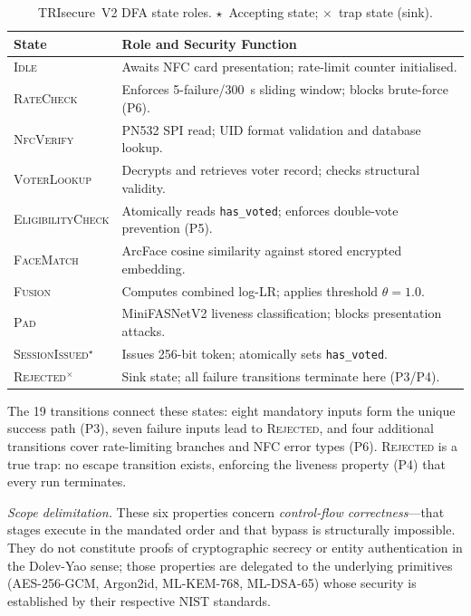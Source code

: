 \documentclass[conference]{IEEEtran}
\begin{document}
\begin{table}[t]
\centering
\caption{TRIsecure~V2 DFA state roles.
  $\star$~Accepting state; $\times$~trap state (sink).}
\label{tab:dfa_states}
\begin{tabular}{lp{5.2cm}}
  \toprule
  State & Role and Security Function \\
  \midrule
  \textsc{Idle}
    & Awaits NFC card presentation; rate-limit counter initialised. \\
  \textsc{RateCheck}
    & Enforces 5-failure/300~s sliding window; blocks brute-force (P6). \\
  \textsc{NfcVerify}
    & PN532 SPI read; UID format validation and database lookup. \\
  \textsc{VoterLookup}
    & Decrypts and retrieves voter record; checks structural validity. \\
  \textsc{EligibilityCheck}
    & Atomically reads \texttt{has\_voted}; enforces double-vote prevention (P5). \\
  \textsc{FaceMatch}
    & ArcFace cosine similarity against stored encrypted embedding. \\
  \textsc{Fusion}
    & Computes combined log-LR; applies threshold \(\theta{=}1.0\). \\
  \textsc{Pad}
    & MiniFASNetV2 liveness classification; blocks presentation attacks. \\
  \textsc{SessionIssued}$^\star$
    & Issues 256-bit token; atomically sets \texttt{has\_voted}. \\
  \textsc{Rejected}$^\times$
    & Sink state; all failure transitions terminate here (P3/P4). \\
  \bottomrule
\end{tabular}
\end{table}

The 19 transitions connect these states: eight mandatory inputs form the
unique success path (P3), seven failure inputs lead to \textsc{Rejected},
and four additional transitions cover rate-limiting branches and NFC
error types (P6). \textsc{Rejected} is a true trap: no escape transition
exists, enforcing the liveness property (P4) that every run terminates.

\textit{Scope delimitation.} These six properties concern
\emph{control-flow correctness}—that stages execute in the mandated
order and that bypass is structurally impossible. They do not constitute
proofs of cryptographic secrecy or entity authentication in the
Dolev-Yao sense; those properties are delegated to the underlying
primitives (AES-256-GCM, Argon2id, ML-KEM-768, ML-DSA-65) whose
security is established by their respective NIST standards.
\end{document}
